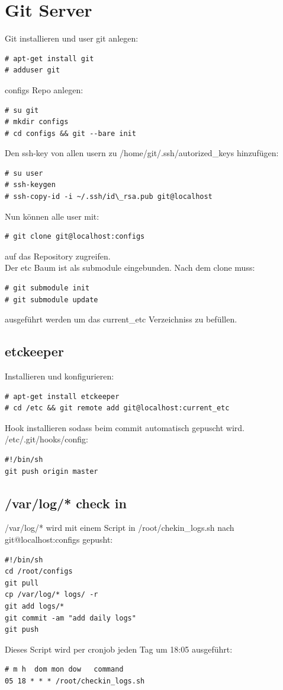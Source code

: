 \section{Git Server}
Git installieren und user git anlegen:
\begin{lstlisting}[style=Bash]
# apt-get install git
# adduser git
\end{lstlisting}
configs Repo anlegen:
\begin{lstlisting}[style=Bash]
# su git
# mkdir configs
# cd configs && git --bare init
\end{lstlisting}
Den ssh-key von allen usern zu /home/git/.ssh/autorized\_keys hinzufügen:
\begin{lstlisting}[style=Bash]
# su user
# ssh-keygen
# ssh-copy-id -i ~/.ssh/id\_rsa.pub git@localhost
\end{lstlisting}
Nun können alle user mit:
\begin{lstlisting}[style=Bash]
# git clone git@localhost:configs
\end{lstlisting}
auf das Repository zugreifen.\\
Der etc Baum ist als submodule eingebunden. Nach dem clone muss:
\begin{lstlisting}[style=Bash]
# git submodule init
# git submodule update
\end{lstlisting}
ausgeführt werden um das current\_etc Verzeichniss zu befüllen.
\subsection{etckeeper}
Installieren und konfigurieren:
\begin{lstlisting}[style=Bash]
# apt-get install etckeeper
# cd /etc && git remote add git@localhost:current_etc
\end{lstlisting}
Hook installieren sodass beim commit automatisch gepuscht wird.\\
/etc/.git/hooks/config:
\begin{lstlisting}[style=Bash]
#!/bin/sh
git push origin master
\end{lstlisting}

\subsection{/var/log/* check in}
/var/log/* wird mit einem Script in /root/chekin\_logs.sh nach git@localhost:configs gepusht:
\begin{lstlisting}[style=Bash]
#!/bin/sh
cd /root/configs
git pull
cp /var/log/* logs/ -r
git add logs/*
git commit -am "add daily logs"
git push
\end{lstlisting}
Dieses Script wird per cronjob jeden Tag um 18:05 ausgeführt:
\begin{lstlisting}[style=Bash]
# m h  dom mon dow   command
05 18 * * * /root/checkin_logs.sh
\end{lstlisting}
